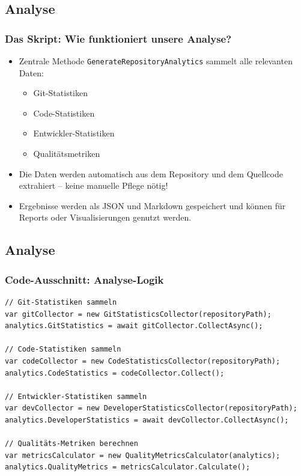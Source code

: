 \documentclass{beamer}
\begin{document}
\subsection{Analyse}
\begin{frame}
\frametitle{Das Skript: Wie funktioniert unsere Analyse?}
\begin{itemize}
  \item Zentrale Methode \texttt{GenerateRepositoryAnalytics} sammelt alle relevanten Daten:
  \begin{itemize}
    \item Git-Statistiken 
    \item Code-Statistiken
    \item Entwickler-Statistiken
    \item Qualitätsmetriken
  \end{itemize}
  \item Die Daten werden automatisch aus dem Repository und dem Quellcode extrahiert – keine manuelle Pflege nötig!
  \item Ergebnisse werden als JSON und Markdown gespeichert und können für Reports oder Visualisierungen genutzt werden.
\end{itemize}
\end{frame}

\subsection{Analyse}
\begin{frame}[fragile]
\frametitle{Code-Ausschnitt: Analyse-Logik}
\begin{lstlisting}[language=CSharp, basicstyle=\ttfamily\tiny, breaklines=true]
// Git-Statistiken sammeln
var gitCollector = new GitStatisticsCollector(repositoryPath);
analytics.GitStatistics = await gitCollector.CollectAsync();

// Code-Statistiken sammeln
var codeCollector = new CodeStatisticsCollector(repositoryPath);
analytics.CodeStatistics = codeCollector.Collect();

// Entwickler-Statistiken sammeln
var devCollector = new DeveloperStatisticsCollector(repositoryPath);
analytics.DeveloperStatistics = await devCollector.CollectAsync();

// Qualitäts-Metriken berechnen
var metricsCalculator = new QualityMetricsCalculator(analytics);
analytics.QualityMetrics = metricsCalculator.Calculate();
\end{lstlisting}
\end{frame}
\end{document}
